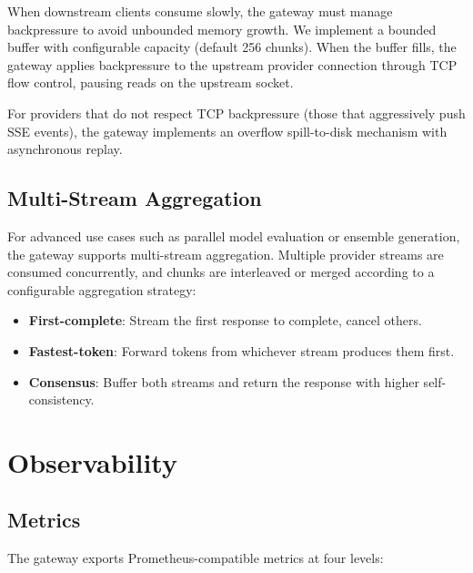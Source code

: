 \documentclass[11pt,twocolumn]{article}
\begin{document}
When downstream clients consume slowly, the gateway must manage backpressure to avoid unbounded memory growth. We implement a bounded buffer with configurable capacity (default 256 chunks). When the buffer fills, the gateway applies backpressure to the upstream provider connection through TCP flow control, pausing reads on the upstream socket.

For providers that do not respect TCP backpressure (those that aggressively push SSE events), the gateway implements an overflow spill-to-disk mechanism with asynchronous replay.

\subsection{Multi-Stream Aggregation}

For advanced use cases such as parallel model evaluation or ensemble generation, the gateway supports multi-stream aggregation. Multiple provider streams are consumed concurrently, and chunks are interleaved or merged according to a configurable aggregation strategy:

\begin{itemize}[leftmargin=*]
    \item \textbf{First-complete}: Stream the first response to complete, cancel others.
    \item \textbf{Fastest-token}: Forward tokens from whichever stream produces them first.
    \item \textbf{Consensus}: Buffer both streams and return the response with higher self-consistency.
\end{itemize}

\section{Observability}
\label{sec:observability}

\subsection{Metrics}

The gateway exports Prometheus-compatible metrics at four levels:
\end{document}
